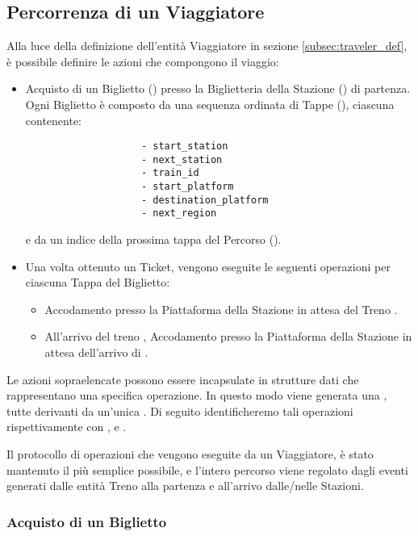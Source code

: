 \subsection{Percorrenza di un Viaggiatore}\label{subsec:percorrenza_viaggiatore}
	
	Alla luce della definizione dell'entità Viaggiatore in sezione \ref{subsec:traveler_def}, è possibile definire le azioni che compongono il viaggio:
		\begin{itemize}
			\item Acquisto di un Biglietto () presso la Biglietteria della Stazione () di partenza. Ogni Biglietto è composto da una sequenza ordinata di Tappe (), ciascuna contenente:
				\begin{verbatim}
					- start_station
					- next_station
					- train_id 
					- start_platform 
					- destination_platform
					- next_region
				\end{verbatim}
			e da un indice della prossima tappa del Percorso ().
			
			\item Una volta ottenuto un Ticket, vengono eseguite le seguenti operazioni per ciascuna Tappa del Biglietto:
				\begin{itemize}
					\item Accodamento presso la Piattaforma  della Stazione  in attesa del Treno .
					\item All'arrivo del treno , Accodamento presso la Piattaforma  della Stazione  in attesa dell'arrivo di . 
				\end{itemize}
		\end{itemize} 
	Le azioni sopraelencate possono essere incapsulate in strutture dati che rappresentano una specifica operazione. In questo modo viene generata una , tutte derivanti da un'unica . Di seguito identificheremo tali operazioni rispettivamente con ,  e .
	
	Il protocollo di operazioni che vengono eseguite da un Viaggiatore, è stato mantenuto il più semplice possibile, e l'intero percorso viene regolato dagli eventi generati dalle entità Treno alla partenza e all'arrivo dalle/nelle Stazioni. 
	
	\subsubsection{Acquisto di un Biglietto}\label{subsubsec:buy_ticket}
	
